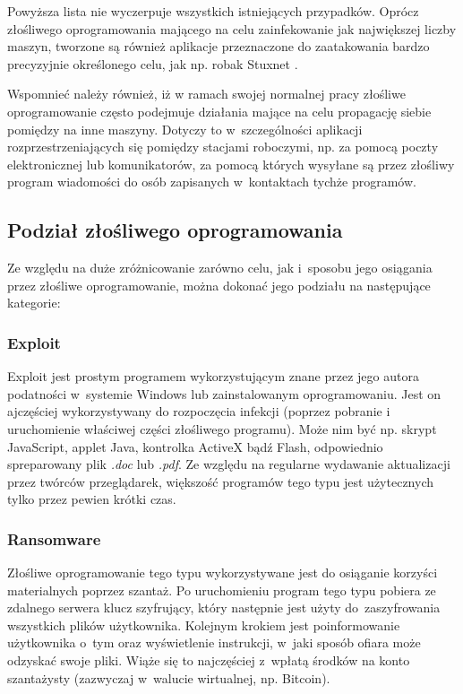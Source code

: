 \documentclass[a4paper,12pt,oneside]{article}
\begin{document}
	Powyższa lista nie wyczerpuje wszystkich istniejących przypadków. Oprócz złośliwego oprogramowania mającego na celu zainfekowanie jak największej liczby maszyn, tworzone są również aplikacje przeznaczone do zaatakowania bardzo precyzyjnie określonego celu, jak np. robak Stuxnet \cite{www-stuxnet}.
	
	Wspomnieć należy również, iż w ramach swojej normalnej pracy złośliwe oprogramowanie często podejmuje działania mające na celu propagację siebie pomiędzy na inne maszyny. Dotyczy to w~szczególności aplikacji rozprzestrzeniających się pomiędzy stacjami roboczymi, np. za pomocą poczty elektronicznej lub komunikatorów, za pomocą których wysyłane są przez złośliwy program wiadomości do osób zapisanych w~kontaktach tychże programów.
	
	\subsection{Podział złośliwego oprogramowania}
	
	Ze względu na duże zróżnicowanie zarówno celu, jak i~sposobu jego osiągania przez złośliwe oprogramowanie, można dokonać jego podziału na następujące kategorie:
	
	\subsubsection{Exploit} 
	Exploit jest prostym programem wykorzystującym znane przez jego autora podatności w~systemie Windows lub zainstalowanym oprogramowaniu. Jest on ajczęściej wykorzystywany do rozpoczęcia infekcji (poprzez pobranie i uruchomienie właściwej części złośliwego programu). Może nim być np. skrypt JavaScript, applet Java, kontrolka ActiveX bądź Flash, odpowiednio spreparowany plik \textit{.doc} lub \textit{.pdf}. Ze względu na regularne wydawanie aktualizacji przez twórców przeglądarek, większość programów tego typu jest użytecznych tylko przez pewien krótki czas.
	
	\subsubsection{Ransomware}
	Złośliwe oprogramowanie tego typu wykorzystywane jest do osiąganie korzyści materialnych poprzez szantaż. Po uruchomieniu program tego typu pobiera ze zdalnego serwera klucz szyfrujący, który następnie jest użyty do~zaszyfrowania wszystkich plików użytkownika. Kolejnym krokiem jest poinformowanie użytkownika o~tym oraz wyświetlenie instrukcji, w~jaki sposób ofiara może odzyskać swoje pliki. Wiąże się to najczęściej z~wpłatą środków na konto szantażysty (zazwyczaj w~walucie wirtualnej, np. Bitcoin).
		
\end{document}

